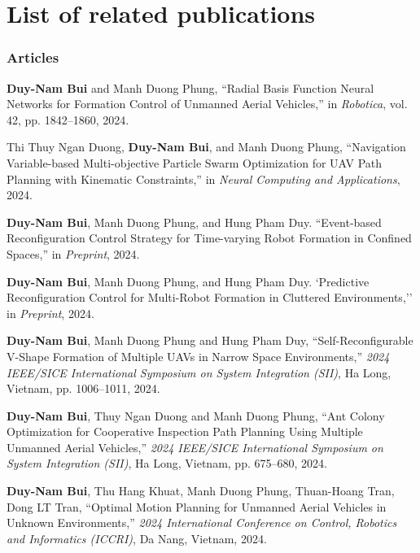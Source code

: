 \chapter*{List of related publications}

\subsection*{Articles}
\textbf{Duy-Nam Bui} and Manh Duong Phung, ``Radial Basis Function Neural Networks for Formation Control of Unmanned Aerial Vehicles,'' in \textit{Robotica}, vol. 42, pp. {1842--1860}, 2024.

Thi Thuy Ngan Duong, \textbf{Duy-Nam Bui}, and Manh Duong Phung, ``Navigation Variable-based Multi-objective Particle Swarm Optimization for UAV Path Planning with Kinematic Constraints,'' in \textit{Neural Computing and Applications}, 2024.

\textbf{Duy-Nam Bui}, Manh Duong Phung, and Hung Pham Duy. ``Event-based Reconfiguration Control Strategy for Time-varying Robot Formation in Confined Spaces,'' in \textit{Preprint}, 2024.

\textbf{Duy-Nam Bui}, Manh Duong Phung, and Hung Pham Duy. `Predictive Reconfiguration Control for Multi-Robot Formation in Cluttered Environments,'' in \textit{Preprint}, 2024.

\textbf{Duy-Nam Bui}, Manh Duong Phung and Hung Pham Duy, ``Self-Reconfigurable V-Shape Formation of Multiple UAVs in Narrow Space Environments,'' \textit{2024 IEEE/SICE International Symposium on System Integration (SII)}, Ha Long, Vietnam, pp. 1006--1011, 2024.

\textbf{Duy-Nam Bui}, Thuy Ngan Duong and Manh Duong Phung, ``Ant Colony Optimization for Cooperative Inspection Path Planning Using Multiple Unmanned Aerial Vehicles,'' \textit{2024 IEEE/SICE International Symposium on System Integration (SII)}, Ha Long, Vietnam, pp. 675--680, 2024.

\textbf{Duy-Nam Bui}, Thu Hang Khuat, Manh Duong Phung, Thuan-Hoang Tran, Dong LT Tran, ``Optimal Motion Planning for Unmanned Aerial Vehicles in Unknown Environments,'' \textit{2024 International Conference on Control, Robotics and Informatics (ICCRI)}, Da Nang, Vietnam, 2024.


